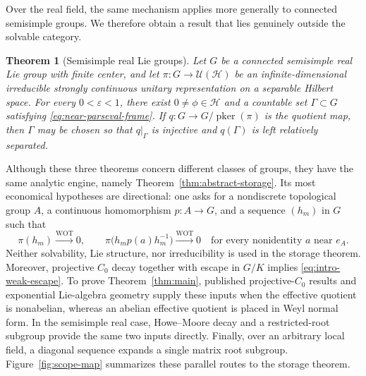 \documentclass[reqno]{amsart}
\numberwithin{equation}{section}
\newtheorem{theorem}{Theorem}[section]
\theoremstyle{definition}
\theoremstyle{remark}
\newcommand{\cH}{\mathcal H}
\newcommand{\U}{\mathcal U}
\newcommand{\pker}{\operatorname{pker}}
\begin{document}
Over the real field, the same mechanism applies more generally to connected
semisimple groups.  We therefore obtain a result that lies genuinely outside
the solvable category.

\begin{theorem}[Semisimple real Lie groups]\label{thm:simple-main}
Let $G$ be a connected semisimple real Lie group with finite center,
and let $\pi:G\to\U(\cH)$ be an infinite-dimensional irreducible strongly
continuous unitary representation on a separable Hilbert space.  For every
$0<\varepsilon<1$, there exist $0\neq\phi\in\cH$ and a countable set
$\Gamma\subset G$ satisfying \eqref{eq:near-parseval-frame}.  If
$q:G\to G/\pker(\pi)$ is the quotient map, then $\Gamma$ may be chosen so
that $q|_\Gamma$ is injective and $q(\Gamma)$ is left relatively separated.
\end{theorem}

Although these three theorems concern different classes of groups, they have
the same analytic engine, namely Theorem~\ref{thm:abstract-storage}.  Its most
economical hypotheses are directional: one asks for a nondiscrete topological
group $A$,
a continuous homomorphism $p:A\to G$, and a sequence $(h_m)$ in $G$ such that
\begin{equation}\label{eq:intro-weak-escape}
 \pi(h_m)\xrightarrow{\mathrm{WOT}}0,
 \qquad
 \pi\bigl(h_m p(a)h_m^{-1}\bigr)
       \xrightarrow{\mathrm{WOT}}0
 \quad\text{for every nonidentity $a$ near $e_A$}.
\end{equation}
Neither solvability, Lie structure, nor irreducibility is used in the storage
theorem.  Moreover, projective $C_0$ decay together with escape in $G/K$
implies \eqref{eq:intro-weak-escape}.  To prove Theorem~\ref{thm:main}, published
projective-$C_0$ results and exponential Lie-algebra geometry supply these
inputs when the effective quotient is nonabelian, whereas an abelian
effective quotient is placed in Weyl normal form.  In the semisimple real
case, Howe--Moore decay and a restricted-root subgroup provide the same two
inputs directly.  Finally, over an arbitrary local field, a diagonal sequence
expands a single matrix root subgroup.  Figure~\ref{fig:scope-map} summarizes
these parallel routes to the storage theorem.
\end{document}

